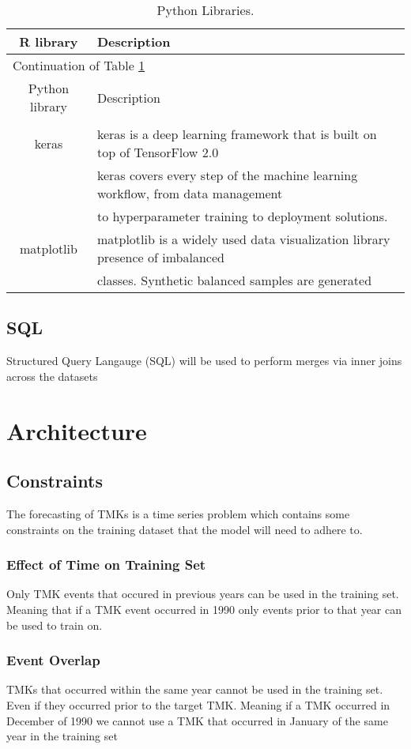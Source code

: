  \begin{longtable}[c]{| c | l |}
 \hline
 R library & Description\\
 \hline
 \endfirsthead

 \hline
 \multicolumn{2}{|l|}{Continuation of Table \ref{long}}\\
 \hline
 Python library & Description\\
 \hline
 \endhead
 \hline
   \caption{Python Libraries.\label{long}}\\
 \endlastfoot
keras \cite{keras} & keras is a deep learning framework that is built on top of TensorFlow 2.0 \\
& keras covers every step of the machine learning workflow, from data management \\
& to hyperparameter training to deployment solutions.\\
 \hline
matplotlib \cite{Matplotlib} & matplotlib is a widely used data visualization library presence of imbalanced \\
& classes. Synthetic balanced samples are generated \\ 
 \end{longtable}

\subsection{SQL}
Structured Query Langauge (SQL) will be used to perform merges via inner joins across the datasets

\section{Architecture}
\subsection{Constraints}
The forecasting of TMKs is a time series problem which contains some constraints on the training dataset that the model will need to adhere to.

\subsubsection{Effect of Time on Training Set}
Only TMK events that occured in previous years can be used in the training set. Meaning that if a TMK event occurred in 1990 only events prior to that year can be used to train on.


\subsubsection{Event Overlap}
TMKs that occurred within the same year cannot be used in the training set. Even if they occurred prior to the target TMK. Meaning if a TMK occurred in December of 1990 we cannot use a TMK that occurred in January of the same year in the training set

